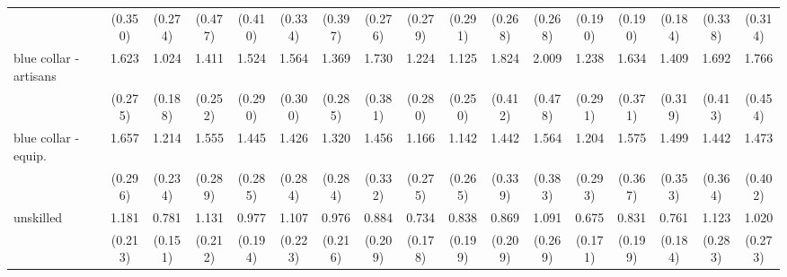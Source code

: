 {\begin{tabular}{l*{16}{c}}
                    &     (0.350)         &     (0.274)         &     (0.477)         &     (0.410)         &     (0.334)         &     (0.397)         &     (0.276)         &     (0.279)         &     (0.291)         &     (0.268)         &     (0.268)         &     (0.190)         &     (0.190)         &     (0.184)         &     (0.338)         &     (0.314)         \\
[1em]
blue collar - artisans&       1.623\sym{**} &       1.024         &       1.411         &       1.524\sym{*}  &       1.564\sym{*}  &       1.369         &       1.730\sym{*}  &       1.224         &       1.125         &       1.824\sym{**} &       2.009\sym{**} &       1.238         &       1.634\sym{*}  &       1.409         &       1.692\sym{*}  &       1.766\sym{*}  \\
                    &     (0.275)         &     (0.188)         &     (0.252)         &     (0.290)         &     (0.300)         &     (0.285)         &     (0.381)         &     (0.280)         &     (0.250)         &     (0.412)         &     (0.478)         &     (0.291)         &     (0.371)         &     (0.319)         &     (0.413)         &     (0.454)         \\
[1em]
blue collar - equip.&       1.657\sym{**} &       1.214         &       1.555\sym{*}  &       1.445         &       1.426         &       1.320         &       1.456         &       1.166         &       1.142         &       1.442         &       1.564         &       1.204         &       1.575         &       1.499         &       1.442         &       1.473         \\
                    &     (0.296)         &     (0.234)         &     (0.289)         &     (0.285)         &     (0.284)         &     (0.284)         &     (0.332)         &     (0.275)         &     (0.265)         &     (0.339)         &     (0.383)         &     (0.293)         &     (0.367)         &     (0.353)         &     (0.364)         &     (0.402)         \\
[1em]
unskilled           &       1.181         &       0.781         &       1.131         &       0.977         &       1.107         &       0.976         &       0.884         &       0.734         &       0.838         &       0.869         &       1.091         &       0.675         &       0.831         &       0.761         &       1.123         &       1.020         \\
                    &     (0.213)         &     (0.151)         &     (0.212)         &     (0.194)         &     (0.223)         &     (0.216)         &     (0.209)         &     (0.178)         &     (0.199)         &     (0.209)         &     (0.269)         &     (0.171)         &     (0.199)         &     (0.184)         &     (0.283)         &     (0.273)         \\

\end{tabular}}
